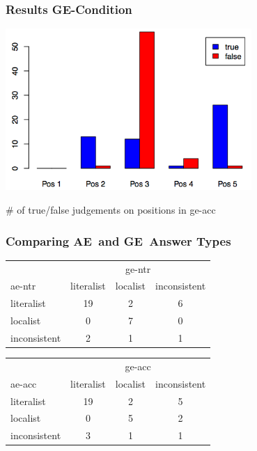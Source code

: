 \documentclass[fleqn,10pt,serif,xcolor=dvipsnames]{beamer}
\renewcommand{\AE}{AE}
\newcommand{\GE}{GE}
\begin{document}
\begin{frame}
  \frametitle{Results \GE-Condition}
  \begin{center}
    \includegraphics[width=0.7\textwidth]{../../pictures/ge-acc.png}

    \vspace{0.2cm}
    \# of true/false judgements on positions in ge-acc
  \end{center}
\end{frame}


\begin{frame}
  \frametitle{Comparing \AE\ and \GE\ Answer Types}

  \begin{center}
    \begin{tabular}{lccc}
      & \multicolumn{3}{c}{ge-ntr} \\ \cmidrule(r){2-4}
      ae-ntr & literalist & localist & inconsistent \\ \midrule
      literalist   & 19 & 2 & 6\\
      localist     &  0 & 7 & 0 \\
      inconsistent &  2 & 1 & 1\\
    \end{tabular}
  \end{center}

  \medskip

  \begin{center}
    \begin{tabular}{lccc}
      & \multicolumn{3}{c}{ge-acc} \\ \cmidrule(r){2-4}
      ae-acc & literalist & localist & inconsistent \\ \midrule
      literalist   & 19 & 2 & 5\\
      localist     &  0 & 5 & 2 \\
      inconsistent &  3 & 1 & 1\\
    \end{tabular}
  \end{center}

\end{frame}
\end{document}

